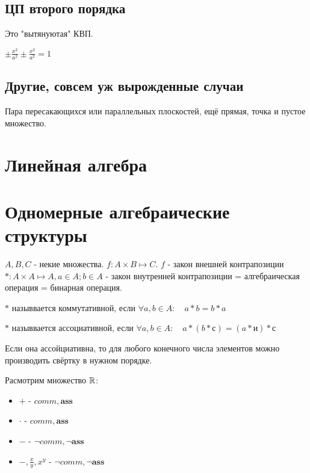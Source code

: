 \documentclass[12pt, a4paper]{article}
\begin{document}
    \subsection{ЦП второго порядка}

    Это "вытянуютая" КВП.

    $\pm\frac{x^2}{a^2} \pm\frac{x^2}{a^2} = 1$

    \subsection{Другие, совсем уж вырожденные случаи}
    Пара пересакающихся или параллельных плоскостей, ещё прямая, точка и пустое множество. 

    \section{Линейная алгебра}

    \section{Одномерные алгебраические структуры}

    \begin{definition}
        $A, B, C$ - некие множества.
        $f: A \times B \mapsto C$.
        $f$ - закон внешней контрапозиции
        $*: A \times A \mapsto A , a \in A; b \in A$ - закон внутренней контрапозиции = алгебраическая операция = бинарная операция.
    \end{definition}

    \begin{definition}
        $*$ назыввается коммутативной, если $\forall a, b \in A: \quad a * b = b * a$
    \end{definition}

    \begin{definition}
        $*$ назыввается ассоциативной, если $\forall a, b \in A: \quad a * (b * с) = (a * и) * с$
    \end{definition}

    Если она ассойциативна, то для любого конечного числа элементов можно производить свёртку в нужном порядке.

    \begin{example}
        Расмотрим множество ${\mathbb{R}}$:
        \begin{itemize}
            \item $+$ - $comm, \symbf{ass}$
            \item $\cdot$ - $comm, \symbf{ass}$
            \item $-$ - $\lnot comm, \lnot \symbf{ass}$
            \item $-, \frac{x}{y}, x^y$ - $\lnot comm, \lnot \symbf{ass}$
        \end{itemize}
    \end{example}
\end{document}

